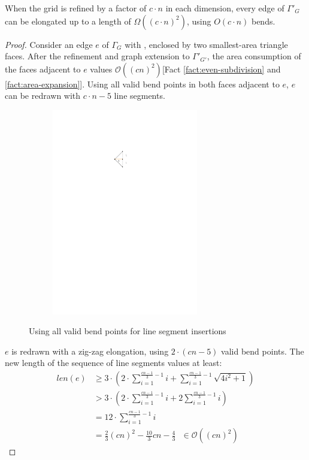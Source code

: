 \begin{lemma}\label{lemma:minimum-length}
\end{lemma}
When the grid is refined by a factor of $c\cdot n$ in each dimension, every edge of $\Gamma'_G$ can be elongated up to a length of $\Omega((c\cdot n)^2)$, using $O(c\cdot n)$ bends.
\begin{proof}
	Consider an edge $e$ of $\Gamma_G$ with \UL, enclosed by two smallest-area triangle faces. After the refinement and graph extension to $\Gamma'_{G'}$, the area consumption of the faces adjacent to $e$ values $\mathcal{O}((cn)^2)$[Fact \ref{fact:even-subdivision} and \ref{fact:area-expansion}]. Using all valid bend points in both faces adjacent to $e$, $e$ can be redrawn with $c\cdot n - 5$ line segments.
	
	\begin{figure}[H]
		\centering
		\begin{subfigure}{0.3\linewidth}
			\centering
			\includegraphics[width=0.7\textwidth,page=3]{drawings/maximal_planar.pdf}
		\end{subfigure}
		\caption{Using all valid bend points for line segment insertions}\label{im:all_valid_bend_points}
	\end{figure}
	
	$e$ is redrawn with a zig-zag elongation, using $2\cdot (cn-5)$ valid bend points. The new length of the sequence of line segments values at least:
	\begin{align}
		len(e) &\geq 3\cdot \left(2\cdot \sum_{i=1}^{\frac{cn-1}{3}-1}i + \sum_{i=1}^{\frac{cn-1}{3}-1}\sqrt{4i^2+1}\right)\\
		&> 3\cdot \left(2\cdot \sum_{i=1}^{\frac{cn-1}{3}-1}i + 2 \sum_{i=1}^{\frac{cn-1}{3}-1}i\right)\\
		&= 12 \cdot \sum_{i=1}^{\frac{cn-1}{3}-1}i\\
		&= \frac{2}{3}(cn)^2-\frac{10}{3}cn-\frac{4}{3}~~~\in \mathcal{O}((cn)^2)\label{eq:minimum-length-cn}
	\end{align}
\end{proof}
\bigskip

